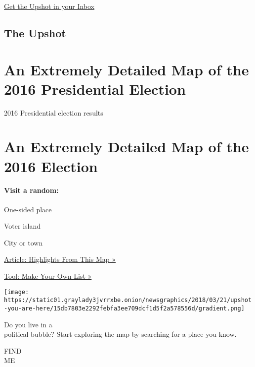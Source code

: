\href{http://www.nytimes3xbfgragh.onion/newsletters/upshot/}{Get the
Upshot in your Inbox}

\href{/upshot}{}

\hypertarget{the-upshot}{%
\subsection{The Upshot}\label{the-upshot}}

\hypertarget{an-extremely-detailed-map-of-the-2016-presidential-election}{%
\section{An Extremely Detailed Map of the 2016 Presidential
Election}\label{an-extremely-detailed-map-of-the-2016-presidential-election}}

2016 Presidential election results

\hypertarget{an-extremely-detailed-map-of-the-2016-election}{%
\section{An Extremely Detailed Map of the 2016
Election}\label{an-extremely-detailed-map-of-the-2016-election}}

\hypertarget{visit-a-random}{%
\paragraph{Visit a random:}\label{visit-a-random}}

One-sided place

Voter island

City or town

\href{https://www.nytimes3xbfgragh.onion/interactive/2018/07/25/upshot/precinct-map-highlights.html}{Article:
Highlights From This Map »}

\href{https://www.nytimes3xbfgragh.onion/interactive/2018/07/26/upshot/voting-precinct-bubbles-of-your-life.html}{Tool:
Make Your Own List »}

\texttt{[image: https://static01.graylady3jvrrxbe.onion/newsgraphics/2018/03/21/upshot-you-are-here/15db7803e2292febfa3ee709dcf1d5f2a578556d/gradient.png]}

Do you live in a\\
political bubble? Start exploring the map by searching for a place you
know.

FIND\\
ME

